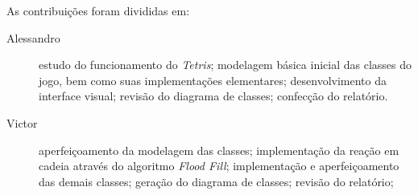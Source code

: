 \documentclass[a4paper, 12pt]{article}
\begin{document}
  As contribuições foram divididas em:

  \begin{description}
    \item[Alessandro] estudo do funcionamento do \emph{Tetris};
    modelagem básica inicial das classes do jogo,
    bem como suas implementações elementares; desenvolvimento da 
    interface visual; revisão do diagrama de classes;
    confecção do relatório.

    \item[Victor] aperfeiçoamento da modelagem das classes;
    implementação da reação em cadeia através do algoritmo
    \emph{Flood Fill}; implementação e aperfeiçoamento
    das demais classes; geração do diagrama de classes;
    revisão do relatório;
  \end{description}
\end{document}
